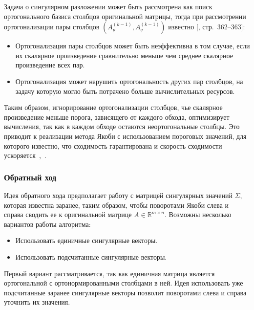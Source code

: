 Задача о сингулярном разложении может быть рассмотрена как поиск ортогонального базиса столбцов оригинальной матрицы, тогда при рассмотрении ортогонализации пары столбцов $(A^{(k-1)}_p, A^{(k-1)}_q)$ известно [, стр.~362–363]:
\begin{itemize}
    \item Ортогонализация пары столбцов может быть неэффективна в том случае, если их скалярное произведение сравнительно меньше чем среднее скалярное произведение всех пар.
    \item Ортогонализация может нарушить ортогональность других пар столбцов, на задачу которую могло быть потрачено больше вычислительных ресурсов. 
\end{itemize}
Таким образом, игнорирование ортогонализации столбцов, чье скалярное произведение меньше порога, зависящего от каждого обхода,  оптимизирует вычисления, так как в каждом обходе остаются неортогональные столбцы. Это приводит к реализации метода Якоби с использованием пороговых значений, для которого известно, что сходимость гарантирована и скорость сходимости ускоряется~\cite{Dongarra2018},~\cite{Forsythe1960}. 
\subsubsection{Обратный ход}


Идея обратного хода предполагает работу с матрицей сингулярных значений $\Sigma$, которая известна заранее, таким образом, чтобы поворотами Якоби слева и справа сводить ее к оригинальной матрице $A \in \mathbb{R}^{m\times n}$. Возможны несколько вариантов работы алгоритма: 
\begin{itemize}
    \item Использовать единичные сингулярные векторы.
    \item Использовать подсчитанные сингулярные векторы.
\end{itemize}
Первый вариант рассматривается, так как единичная матрица является ортогональной с ортонормированными столбцами в ней. 
Идея использовать уже подсчитанные заранее сингулярные векторы позволит поворотами слева и справа уточнить их значения. 

